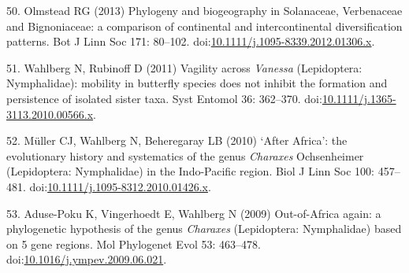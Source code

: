 \documentclass[10pt]{article}
\begin{document}
50. Olmstead RG (2013) Phylogeny and biogeography in Solanaceae,
Verbenaceae and Bignoniaceae: a comparison of continental and
intercontinental diversification patterns. Bot J Linn Soc 171: 80--102.
doi:\href{http://dx.doi.org/10.1111/j.1095-8339.2012.01306.x}{10.1111/j.1095-8339.2012.01306.x}.

51. Wahlberg N, Rubinoff D (2011) Vagility across \textit{Vanessa} (Lepidoptera:
Nymphalidae): mobility in butterfly species does not inhibit the
formation and persistence of isolated sister taxa. Syst Entomol 36:
362--370.
doi:\href{http://dx.doi.org/10.1111/j.1365-3113.2010.00566.x}{10.1111/j.1365-3113.2010.00566.x}.

52. M\"uller CJ, Wahlberg N, Beheregaray LB (2010) `After Africa': the
evolutionary history and systematics of the genus \textit{Charaxes} Ochsenheimer
(Lepidoptera: Nymphalidae) in the Indo-Pacific region. Biol J Linn Soc
100: 457--481.
doi:\href{http://dx.doi.org/10.1111/j.1095-8312.2010.01426.x}{10.1111/j.1095-8312.2010.01426.x}.

53. Aduse-Poku K, Vingerhoedt E, Wahlberg N (2009) Out-of-Africa again:
a phylogenetic hypothesis of the genus \textit{Charaxes} (Lepidoptera:
Nymphalidae) based on 5 gene regions. Mol Phylogenet Evol 53: 463--478.
doi:\href{http://dx.doi.org/10.1016/j.ympev.2009.06.021}{10.1016/j.ympev.2009.06.021}.
\end{document}
